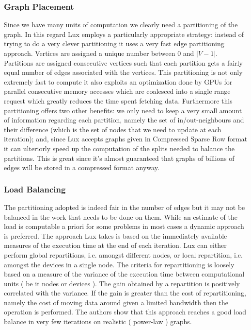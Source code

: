 \documentclass[]{article}
\begin{document}
\subsubsection{Graph Placement}
Since we have many units of computation we clearly need a partitioning of the graph. In this regard Lux employs a particularly appropriate strategy: instead of trying to do a very clever partitioning it uses a very fast edge partitioning approach. Vertices are assigned a unique number between $0$ and $|V-1|$. Partitions are assigned consecutive vertices such that each partition gets a fairly equal number of edges associated with the vertices. This partitioning is not only extremely fast to compute it also exploits an optimization done by GPUs for parallel consecutive memory accesses which are coalesced into a single range request which greatly reduces the time spent fetching data. Furthermore this partitioning offers two other benefits: we only need to keep a very small amount of information regarding each partition, namely the set of in/out-neighbours and their difference (which is the set of nodes that we need to update at each iteration); and, since Lux accepts graphs given in Compressed Sparse Row format it can ulteriorly speed up the computation of the splits needed to balance the partitions. This is great since it's almost guaranteed that graphs of billions of edges will be stored in a compressed format anyway.
\subsubsection{Load Balancing}
The partitioning adopted is indeed fair in the number of edges but it may not be balanced in the work that needs to be done on them. While an estimate of the load is computable a priori for some problems in most cases a dynamic approach is preferred. The approach Lux takes is based on the immediately available measures of the execution time at the end of each iteration. Lux can either perform global repartitions, i.e. amongst different nodes, or local repartition, i.e. amongst the devices in a single node. The criteria for repartitioning is loosely based on a measure of the variance of the execution time between computational units ( be it nodes or devices ). The gain obtained by a repartition is positively correlated with the variance. If the gain is greater than the cost of repartitioning, namely the cost of moving data around given a limited bandwidth then the operation is performed. The authors show that this approach reaches a good load balance in very few iterations on realistic ( power-law ) graphs.
\end{document}
